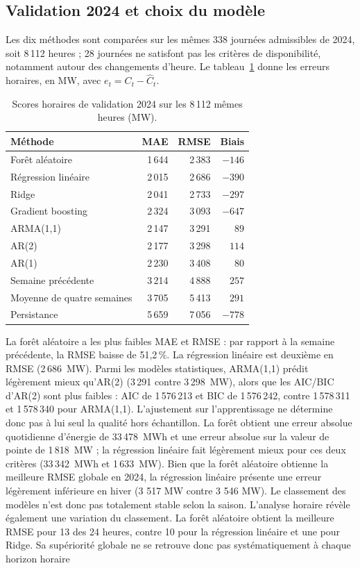 \subsection{Validation 2024 et choix du modèle}
Les dix méthodes sont comparées sur les mêmes 338 journées admissibles de 2024, soit 8\,112 heures ; 28 journées ne satisfont pas les critères de disponibilité, notamment autour des changements d'heure. Le tableau~\ref{tab:scores} donne les erreurs horaires, en MW, avec $e_t=C_t-\widehat C_t$.
\begin{table}[htbp]
  \centering\fontsize{9}{11}\selectfont\renewcommand{\arraystretch}{1.08}
  \caption{Scores horaires de validation 2024 sur les 8\,112 mêmes heures (MW).}\label{tab:scores}
  \begin{tabular}{lrrr}\toprule
  Méthode & MAE & RMSE & Biais\\\midrule
  Forêt aléatoire & 1\,644 & 2\,383 & $-146$\\
  Régression linéaire & 2\,015 & 2\,686 & $-390$\\
  Ridge & 2\,041 & 2\,733 & $-297$\\
  Gradient boosting & 2\,324 & 3\,093 & $-647$\\
  ARMA(1,1) & 2\,147 & 3\,291 & $89$\\
  AR(2) & 2\,177 & 3\,298 & $114$\\
  AR(1) & 2\,230 & 3\,408 & $80$\\
  Semaine précédente & 3\,214 & 4\,888 & $257$\\
  Moyenne de quatre semaines & 3\,705 & 5\,413 & $291$\\
  Persistance & 5\,659 & 7\,056 & $-778$\\\bottomrule
  \end{tabular}
\end{table}

La forêt aléatoire a les plus faibles MAE et RMSE : par rapport à la semaine précédente, la RMSE baisse de 51,2\,\%. La régression linéaire est deuxième en RMSE (2\,686~MW). Parmi les modèles statistiques, ARMA(1,1) prédit légèrement mieux qu'AR(2) (3\,291 contre 3\,298~MW), alors que les AIC/BIC d'AR(2) sont plus faibles : AIC de 1\,576\,213 et BIC de 1\,576\,242, contre 1\,578\,311 et 1\,578\,340 pour ARMA(1,1). L'ajustement sur l'apprentissage ne détermine donc pas à lui seul la qualité hors échantillon. La forêt obtient une erreur absolue quotidienne d'énergie de 33\,478~MWh et une erreur absolue sur la valeur de pointe de 1\,818~MW ; la régression linéaire fait légèrement mieux pour ces deux critères (33\,342~MWh et 1\,633~MW).  Bien que la forêt aléatoire obtienne la meilleure RMSE globale en 2024, la régression linéaire présente une erreur légèrement inférieure en hiver (3 517 MW contre 3 546 MW). Le classement des modèles n'est donc pas totalement stable selon la saison. L'analyse horaire révèle également une variation du classement. La forêt aléatoire obtient la meilleure RMSE pour 13 des 24 heures, contre 10 pour la régression linéaire et une pour Ridge. Sa supériorité globale ne se retrouve donc pas systématiquement à chaque horizon horaire

